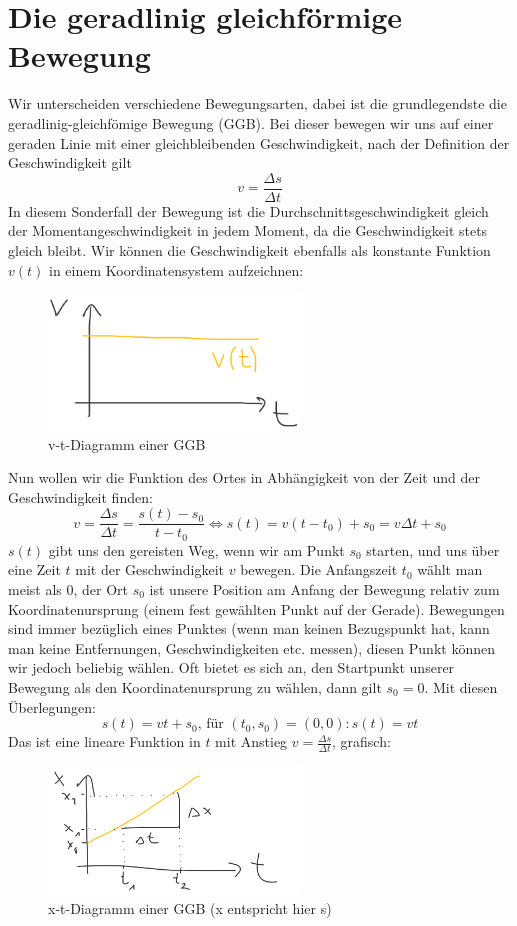 \documentclass[11pt]{article}
\begin{document}
\section{Die geradlinig gleichförmige Bewegung}
Wir unterscheiden verschiedene Bewegungsarten, dabei ist die grundlegendste die geradlinig-gleichfömige Bewegung (GGB). Bei dieser bewegen wir uns auf einer geraden Linie mit einer gleichbleibenden Geschwindigkeit, nach der Definition der Geschwindigkeit gilt $$v = \frac{\Delta s}{\Delta t}$$ In diesem Sonderfall der Bewegung ist die Durchschnittsgeschwindigkeit gleich der Momentangeschwindigkeit in jedem Moment, da die Geschwindigkeit stets gleich bleibt. Wir können die Geschwindigkeit ebenfalls als konstante Funktion $v(t)$ in einem Koordinatensystem aufzeichnen: 
\begin{figure}[H] 
  \centering
     \includegraphics[width=0.6\textwidth]{v-t-diagramm-ggb.png}
     \caption{v-t-Diagramm einer GGB}
\end{figure} 
Nun wollen wir die Funktion des Ortes in Abhängigkeit von der Zeit und der Geschwindigkeit finden: $$v = \frac{\Delta s}{\Delta t} = \frac{s(t) - s_0}{t - t_0} \Longleftrightarrow s(t) = v(t - t_0) + s_0 = v \Delta t + s_0$$
$s(t)$ gibt uns den gereisten Weg, wenn wir am Punkt $s_0$ starten, und uns über eine Zeit $t$ mit der Geschwindigkeit $v$ bewegen. Die Anfangszeit $t_0$ wählt man meist als $0$, der Ort $s_0$ ist unsere Position am Anfang der Bewegung relativ zum Koordinatenursprung (einem fest gewählten Punkt auf der Gerade). Bewegungen sind immer bezüglich eines Punktes (wenn man keinen Bezugspunkt hat, kann man keine Entfernungen, Geschwindigkeiten etc. messen), diesen Punkt können wir jedoch beliebig wählen. Oft bietet es sich an, den Startpunkt unserer Bewegung als den Koordinatenursprung zu wählen, dann gilt $s_0 = 0$. Mit diesen Überlegungen:
$$s(t) = vt+s_0 \text{, für } (t_0, s_0) = (0, 0): s(t) = vt$$
Das ist eine lineare Funktion in $t$ mit Anstieg $\displaystyle v = \frac{\Delta s}{\Delta t}$, grafisch: 
\begin{figure}[H] 
  \centering
     \includegraphics[width=0.6\textwidth]{x-t-diagramm-ggb.png}
     \caption{x-t-Diagramm einer GGB (x entspricht hier s)}
\end{figure} 
\end{document}
